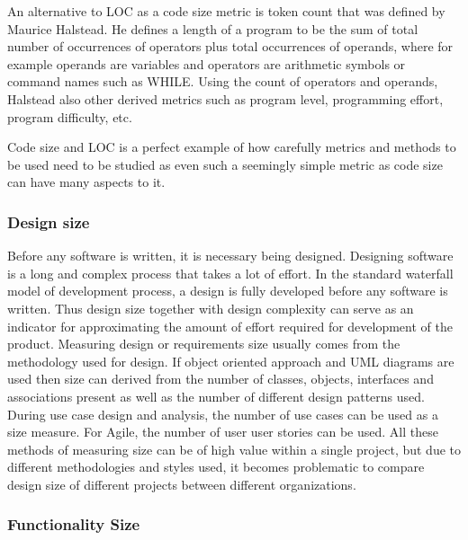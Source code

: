 \documentclass[11pt]{article}
\begin{document}
\par
An alternative to LOC as a code size metric is token count that was defined by Maurice Halstead. He defines a length of a program to be the sum of total number of occurrences of operators plus total occurrences of operands, where for example operands are variables and operators are arithmetic symbols or command names such as WHILE. Using the count of operators and operands, Halstead also other derived metrics such as program level, programming effort, program difficulty, etc.
\par 
Code size and LOC is a perfect example of how carefully metrics and methods to be used need to be studied as even such a seemingly simple metric as code size can have many aspects to it.

\subsubsection{Design size}

Before any software is written, it is necessary being designed. Designing software is a long and complex process that takes a lot of effort. In the standard waterfall model of development process, a design is fully developed before any software is written. Thus design size together with design complexity can serve as an indicator for approximating the amount of effort required for development of the product. Measuring design or requirements size usually comes from the methodology used for design. If object oriented approach and UML diagrams are used then size can derived from the number of classes, objects, interfaces and associations present as well as the number of different design patterns used. During use case design and analysis, the number of use cases can be used as a size measure. For Agile, the number of user user stories can be used. All these methods of measuring size can be of high value within a single project, but due to different methodologies and styles used, it becomes problematic to compare design size of different projects between different organizations.

\subsubsection{Functionality Size}
\end{document}
